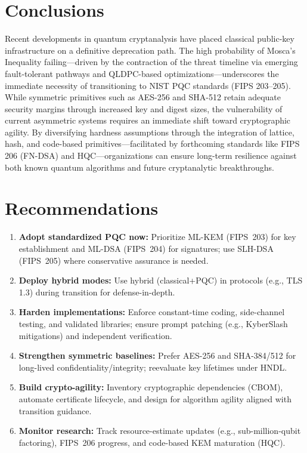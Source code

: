 \documentclass[11pt,a4paper]{article}
\begin{document}
\section{Conclusions}
Recent developments in quantum cryptanalysis have placed classical public-key infrastructure on a definitive deprecation path. The high probability of Mosca’s Inequality failing—driven by the contraction of the threat timeline via emerging fault-tolerant pathways and QLDPC-based optimizations—underscores the immediate necessity of transitioning to NIST PQC standards (FIPS 203–205). While symmetric primitives such as AES-256 and SHA-512 retain adequate security margins through increased key and digest sizes, the vulnerability of current asymmetric systems requires an immediate shift toward cryptographic agility. By diversifying hardness assumptions through the integration of lattice, hash, and code-based primitives—facilitated by forthcoming standards like FIPS 206 (FN-DSA) and HQC—organizations can ensure long-term resilience against both known quantum algorithms and future cryptanalytic breakthroughs.

\section{Recommendations}
\begin{enumerate}[leftmargin=*]
  \item \textbf{Adopt standardized PQC now:} Prioritize ML-KEM (FIPS~203) for key establishment and ML-DSA (FIPS~204) for signatures; use SLH-DSA (FIPS~205) where conservative assurance is needed.
  \item \textbf{Deploy hybrid modes:} Use hybrid (classical+PQC) in protocols (e.g., TLS 1.3) during transition for defense-in-depth.
  \item \textbf{Harden implementations:} Enforce constant-time coding, side-channel testing, and validated libraries; ensure prompt patching (e.g., KyberSlash mitigations) and independent verification.
  \item \textbf{Strengthen symmetric baselines:} Prefer AES-256 and SHA-384/512 for long-lived confidentiality/integrity; reevaluate key lifetimes under HNDL.
  \item \textbf{Build crypto-agility:} Inventory cryptographic dependencies (CBOM), automate certificate lifecycle, and design for algorithm agility aligned with transition guidance.
  \item \textbf{Monitor research:} Track resource-estimate updates (e.g., sub-million-qubit factoring), FIPS~206 progress, and code-based KEM maturation (HQC).
\end{enumerate}
\end{document}
